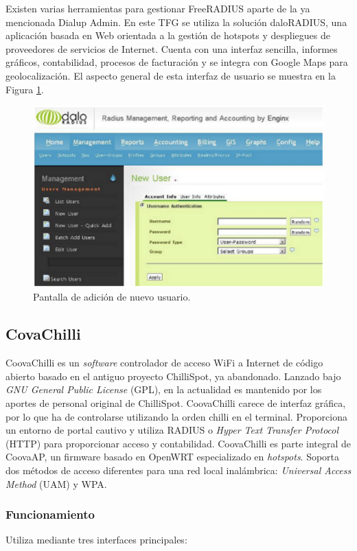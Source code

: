 Existen varias herramientas para gestionar FreeRADIUS aparte de la ya mencionada Dialup Admin. En este TFG se utiliza la solución daloRADIUS, una aplicación basada en Web orientada a la gestión de hotspots y despliegues de proveedores de servicios de Internet. Cuenta con una interfaz sencilla, informes gráficos, contabilidad, procesos de facturación y se integra con Google Maps para geolocalización. El aspecto general de esta interfaz de usuario se muestra en la Figura \ref{daloRADIUS1}.

\begin{figure}[!t]
\begin{center}
\includegraphics[width=0.75\linewidth]{./3_Tecnologias/Img/daloRADIUS1.png}
\end{center}
\caption{Pantalla de adición de nuevo usuario.}
\label{daloRADIUS1}
\end{figure}

\subsection{CovaChilli}
CoovaChilli es un \emph{software} controlador de acceso WiFi a Internet de código abierto basado en el antiguo proyecto ChilliSpot, ya abandonado. Lanzado bajo \emph{GNU General Public License} (GPL), en la actualidad es mantenido por los aportes de personal original de ChilliSpot. CoovaChilli carece de interfaz gráfica, por lo que ha de controlarse utilizando la orden chilli en el terminal. Proporciona un entorno de portal cautivo y utiliza RADIUS o \emph{Hyper Text Transfer Protocol} (\acrshort{HTTP}) para proporcionar acceso y contabilidad. CoovaChilli es parte integral de CoovaAP, un firmware basado en OpenWRT especializado en \emph{hotspots}. Soporta dos métodos de acceso diferentes para una red local inalámbrica: \emph{Universal Access Method} (\acrshort{UAM}) y WPA.

\subsubsection{Funcionamiento}
Utiliza mediante tres interfaces principales:


